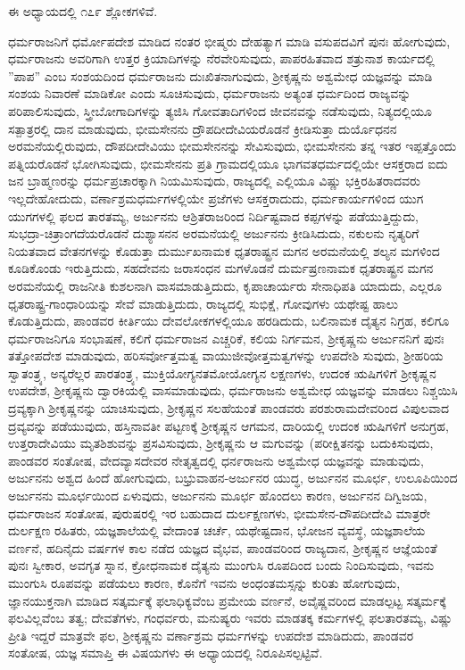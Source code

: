 ಈ ಅಧ್ಯಾಯದಲ್ಲಿ ೧೭೯ ಶ್ಲೋಕಗಳಿವೆ.

ಧರ್ಮರಾಜನಿಗೆ ಧರ್ಮೋಪದೇಶ ಮಾಡಿದ ನಂತರ ಭೀಷ್ಮರು ದೇಹತ್ಯಾಗ ಮಾಡಿ ವಸುಪದವಿಗೆ ಪುನಃ ಹೋಗುವುದು, ಧರ್ಮರಾಜನು ಅವರಿಗಾಗಿ ಉತ್ತರ ಕ್ರಿಯಾದಿಗಳನ್ನು ನೆರವೇರಿಸುವುದು, ಪಾಪರಹಿತವಾದ ಶತ್ರುನಾಶ ಕಾರ್ಯದಲ್ಲಿ ”ಪಾಪ” ಎಂಬ ಸಂಶಯದಿಂದ ಧರ್ಮರಾಜನು ದುಃಖಿತನಾಗುವುದು, ಶ‍್ರೀಕೃಷ್ಣನು ಅಶ್ವಮೇಧ ಯಜ್ಞವನ್ನು ಮಾಡಿ ಸಂಶಯ ನಿವಾರಣೆ ಮಾಡಿಕೋ ಎಂದು ಸೂಚಿಸುವುದು, ಧರ್ಮರಾಜನು ಅತ್ಯಂತ ಧರ್ಮದಿಂದ ರಾಜ್ಯವನ್ನು ಪರಿಪಾಲಿಸುವುದು, ಸ್ತ್ರೀಬೋಗಾದಿಗಳನ್ನು ತ್ಯಜಿಸಿ ಗೋವತಾದಿಗಳಿಂದ ಜೀವನವನ್ನು ನಡೆಸುವುದು, ನಿತ್ಯದಲ್ಲಿಯೂ ಸತ್ಪಾತ್ರರಲ್ಲಿ ದಾನ ಮಾಡುವುದು, ಭೀಮಸೇನನು ದ್ರೌಪದೀದೇವಿಯರೊಡನೆ ಕ್ರೀಡಿಸುತ್ತಾ ದುರ್ಯೊಧನನ ಅರಮನೆಯಲ್ಲಿರುವುದು, ದೌಪದೀದೇವಿಯು ಭೀಮಸೇನನನ್ನು ಸೇವಿಸುವುದು, ಭೀಮಸೇನನು ತನ್ನ ಇತರ ಇಪ್ಪತ್ತೊಂದು ಪತ್ನಿಯರೊಡನೆ ಭೋಗಿಸುವುದು, ಭೀಮಸೇನನು ಪ್ರತಿ ಗ್ರಾಮದಲ್ಲಿಯೂ ಭಾಗವತಧರ್ಮದಲ್ಲಿಯೇ ಆಸಕ್ತರಾದ ಐದು ಜನ ಬ್ರಾಹ್ಮಣರನ್ನು ಧರ್ಮಪ್ರಚಾರಕ್ಕಾಗಿ ನಿಯಮಿಸುವುದು, ರಾಜ್ಯದಲ್ಲಿ ಎಲ್ಲಿಯೂ ವಿಷ್ಣು ಭಕ್ತಿರಹಿತರಾದವರು ಇಲ್ಲದೇಹೋದುದು, ವರ್ಣಾಶ್ರಮಧರ್ಮಗಳಲ್ಲಿಯೇ ಪ್ರಜೆಗಳು ಆಸಕ್ತರಾದುದು, ಧರ್ಮಕಾರ್ಯಗಳಿಂದ ಯುಗ ಯುಗಗಳಲ್ಲಿ ಫಲದ ತಾರತಮ್ಯ, ಅರ್ಜುನನು ಆಶ್ರಿತರಾಜರಿಂದ ನಿರ್ದಿಷ್ಟವಾದ ಕಪ್ಪಗಳನ್ನು ಪಡೆಯುತ್ತಿದ್ದುದು, ಸುಭದ್ರಾ-ಚಿತ್ರಾಂಗದೆಯರೊಡನೆ ದುಶ್ಯಾಸನನ ಅರಮನೆಯಲ್ಲಿ ಅರ್ಜುನನು ಕ್ರೀಡಿಸಿದುದು, ನಕುಲನು ನೃತ್ಯರಿಗೆ ನಿಯತವಾದ ವೇತನಗಳನ್ನು ಕೊಡುತ್ತಾ ದುರ್ಮುಖನಾಮಕ ಧೃತರಾಷ್ಟ್ರನ ಮಗನ ಅರಮನೆಯಲ್ಲಿ ಶಲ್ಯನ ಮಗಳಿಂದ ಕೂಡಿಕೊಂಡು ಇರುತ್ತಿದುದು, ಸಹದೇವನು ಜರಾಸಂಧನ ಮಗಳೊಡನೆ ದುರ್ಮಷ್ರಣನಾಮಕ ಧೃತರಾಷ್ಟ್ರನ ಮಗನ ಅರಮನೆಯಲ್ಲಿ ರಾಜನೀತಿ ಕುಶಲನಾಗಿ ವಾಸಮಾಡುತ್ತಿದುದು, ಕೃಪಾಚಾರ್ಯರು ಸೇನಾಧಿಪತಿ ಯಾದುದು, ಎಲ್ಲರೂ ಧೃತರಾಷ್ಟ್ರ-ಗಾಂಧಾರಿ\-ಯನ್ನು ಸೇವೆ ಮಾಡುತ್ತಿದುದು, ರಾಜ್ಯದಲ್ಲಿ ಸುಭಿಕ್ಷೆ, ಗೋವುಗಳು ಯಥೇಷ್ಟ ಹಾಲು ಕೊಡುತ್ತಿದುದು, ಪಾಂಡವರ ಕೀರ್ತಿಯು ದೇವಲೋಕಗಳಲ್ಲಿಯೂ ಹರಡಿದುದು, ಬಲಿನಾಮಕ ದೈತ್ಯನ ನಿಗ್ರಹ, ಕಲಿಗೂ ಧರ್ಮರಾಜನಿಗೂ ಸಂಭಾಷಣೆ, ಕಲಿಗೆ ಧರ್ಮರಾಜನ ಎಚ್ಚರಿಕೆ, ಕಲಿಯ ನಿರ್ಗಮನ, ಶ‍್ರೀಕೃಷ್ಣನು ಅರ್ಜುನನಿಗೆ ಪುನಃ ತತ್ತೋಪದೇಶ ಮಾಡುವುದು, ಹರಿಸರ್ವೋತ್ತಮತ್ವ ವಾಯುಜೀವೋತ್ತಮತ್ವಗಳನ್ನು ಉಪದೇಶಿ ಸುವುದು, ಶ‍್ರೀಹರಿಯ ಸ್ವಾತಂತ್ರ್ಯ, ಅನ್ಯರೆಲ್ಲರ ಪಾರತಂತ್ರ್ಯ, ಮುಕ್ತಿಯೋಗ್ಯನತಮೋಯೋಗ್ಯನ ಲಕ್ಷಣಗಳು, ಉದಂಕ ಋಷಿಗಳಿಗೆ ಶ‍್ರೀಕೃಷ್ಣನ ಉಪದೇಶ, ಶ‍್ರೀಕೃಷ್ಣನು ದ್ವಾರಕಿಯಲ್ಲಿ ವಾಸಮಾಡುವುದು, ಧರ್ಮರಾಜನು ಅಶ್ವಮೇಧ ಯಜ್ಞವನ್ನು ಮಾಡಲು ನಿಶ್ಚಯಿಸಿ ದ್ರವ್ಯಕ್ಕಾಗಿ ಶ‍್ರೀಕೃಷ್ಣನನ್ನು ಯಾಚಿಸುವುದು, ಶ‍್ರೀಕೃಷ್ಣನ ಸಲಹೆಯಂತೆ ಪಾಂಡವರು ಪರಶುರಾಮದೇವರಿಂದ ವಿಪುಲವಾದ ದ್ರವ್ಯವನ್ನು ಪಡೆಯುವುದು, ಹಸ್ತಿನಾವತೀ ಪಟ್ಟಣಕ್ಕೆ ಶ‍್ರೀಕೃಷ್ಣನ ಆಗಮನ, ದಾರಿಯಲ್ಲಿ ಉದಂಕ ಋಷಿಗಳಿಗೆ ಅನುಗ್ರಹ, ಉತ್ತರಾದೇವಿಯು ಮೃತಶಿಶುವನ್ನು ಪ್ರಸವಿಸುವುದು, ಶ‍್ರೀಕೃಷ್ಣನು ಆ ಮಗುವನ್ನು (ಪರೀಕ್ಷಿತನನ್ನು ಬದುಕಿಸುವುದು, ಪಾಂಡವರ ಸಂತೋಷ, ವೇದವ್ಯಾಸದೇವರ ನೇತೃತ್ವದಲ್ಲಿ ಧನ೯ರಾಜನು ಅಶ್ವಮೇಧ ಯಜ್ಞವನ್ನು ಮಾಡುವುದು, ಅರ್ಜುನನು ಅಶ್ವದ ಹಿಂದೆ ಹೋಗುವುದು, ಬಭ್ರುವಾಹನ-ಅರ್ಜುನರ ಯುದ್ಧ, ಅರ್ಜುನನ ಮೂರ್ಛ, ಉಲೂಪಿಯಿಂದ ಅರ್ಜುನನು ಮೂರ್ಛಯಿಂದ ಏಳುವುದು, ಅರ್ಜುನನು ಮೂರ್ಛ ಹೊಂದಲು ಕಾರಣ, ಅರ್ಜುನನ ದಿಗ್ವಿಜಯ, ಧರ್ಮರಾಜನ ಸಂತೋಷ, ಪುರುಷರಲ್ಲಿ ಇರ ಬಹುದಾದ ದುರ್ಲಕ್ಷಣಗಳು, ಭೀಮಸೇನ-ದೌಪದೀದೇವಿ ಮಾತ್ರರೇ ದುರ್ಲಕ್ಷಣ ರಹಿತರು, ಯಜ್ಞಶಾಲೆಯಲ್ಲಿ ವೇದಾಂತ ಚರ್ಚೆ, ಯಥೇಷ್ಟದಾನ, ಭೋಜನ ವ್ಯವಸ್ಥೆ, ಯಜ್ಞಶಾಲೆಯ ವರ್ಣನೆ, ಹದಿನೈದು ವರ್ಷಗಳ ಕಾಲ ನಡೆದ ಯಜ್ಞದ ವೈಭವ, ಪಾಂಡವರಿಂದ ರಾಜ್ಯದಾನ, ಶ‍್ರೀಕೃಷ್ಣನ ಆಜ್ಞೆಯಂತೆ ಪುನಃ ಸ್ವೀಕಾರ, ಅವಗೃತ ಸ್ನಾನ, ಕ್ರೋಧನಾಮಕ ದೈತ್ಯನು ಮುಂಗುಸಿ ರೂಪದಿಂದ ಬಂದು ನಿಂದಿಸುವುದು, ಇವನು ಮುಂಗುಸಿ ರೂಪವನ್ನು ಪಡೆಯಲು ಕಾರಣ, ಕೊನೆಗೆ ಇವನು ಅಂಧಂತಮಸ್ಸನ್ನು ಕುರಿತು ಹೋಗುವುದು, ಜ್ಞಾನಯುಕ್ತನಾಗಿ ಮಾಡಿದ ಸತ್ಕರ್ಮಕ್ಕೆ ಫಲಾಧಿಕ್ಯವೆಂಬ ಪ್ರಮೇಯ ವರ್ಣನೆ, ಅವೈಷ್ಣವರಿಂದ ಮಾಡಲ್ಪಟ್ಟ ಸತ್ಕರ್ಮಕ್ಕೆ ಫಲವಿಲ್ಲವೆಂಬ ತತ್ವ; ದೇವತೆಗಳು, ಗಂಧರ್ವರು, ಮನುಷ್ಯರು ಇವರು ಮಾಡತಕ್ಕ ಕರ್ಮಗಳಲ್ಲಿ ಫಲತಾರತಮ್ಯ, ವಿಷ್ಣು ಪ್ರೀತಿ ಇದ್ದರೆ ಮಾತ್ರವೇ ಫಲ, ಶ‍್ರೀಕೃಷ್ಣನು ವರ್ಣಾಶ್ರಮ ಧರ್ಮಗಳನ್ನು ಉಪದೇಶ ಮಾಡಿದುದು, ಪಾಂಡವರ ಸಂತೋಷ, ಯಜ್ಞ ಸಮಾಪ್ತಿ ಈ ವಿಷಯಗಳು ಈ ಅಧ್ಯಾಯದಲ್ಲಿ ನಿರೂಪಿಸಲ್ಪಟ್ಟಿವೆ.

